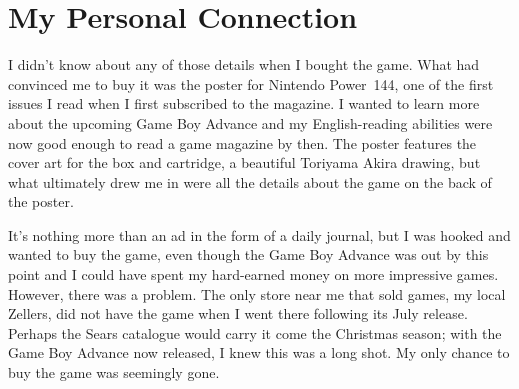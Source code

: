 \documentclass{book}
\let\oldcenter\center
\let\oldendcenter\endcenter
\renewenvironment{center}{\setlength\topsep{0pt}\oldcenter}{\oldendcenter}
\begin{document}
\FloatBarrier\needspace{5pt}\section*{My Personal Connection}\nopagebreak[4]

I didn’t know about any of those details when I bought the game. What had convinced me to buy it was the poster for Nintendo Power 144, one of the first issues I read when I first subscribed to the magazine. I wanted to learn more about the upcoming Game Boy Advance and my English-reading abilities were now good enough to read a game magazine by then. The poster features the cover art for the box and cartridge, a beautiful Toriyama Akira drawing, but what ultimately drew me in were all the details about the game on the back of the poster.

\begin{center}
\vspace{8pt}
\quad\vspace{4pt}
\quad\vspace{4pt}
\quad\vspace{4pt}
\end{center}

It’s nothing more than an ad in the form of a daily journal, but I was hooked and wanted to buy the game, even though the Game Boy Advance was out by this point and I could have spent my hard-earned money on more impressive games. However, there was a problem. The only store near me that sold games, my local Zellers, did not have the game when I went there following its July release. Perhaps the Sears catalogue would carry it come the Christmas season; with the Game Boy Advance now released, I knew this was a long shot. My only chance to buy the game was seemingly gone.
\end{document}
